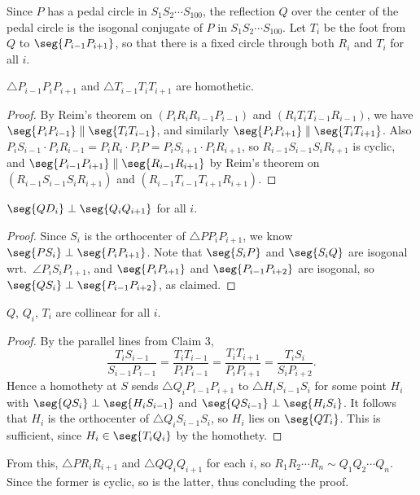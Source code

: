 Since $P$ has a pedal circle in $S_1S_2\cdots S_{100}$, the reflection $Q$ over the center of the pedal circle is the isogonal conjugate of $P$ in $S_1S_2\cdots S_{100}$. Let $T_i$ be the foot from $Q$ to $\seg{P_{i-1}P_{i+1}}$, so that there is a fixed circle through both $R_i$ and $T_i$ for all $i$.
\begin{iclaim}
    $\triangle P_{i-1}P_iP_{i+1}$ and $\triangle T_{i-1}T_iT_{i+1}$ are homothetic.
\end{iclaim}
\begin{proof}
    By Reim's theorem on $(P_iR_iR_{i-1}P_{i-1})$ and $(R_iT_iT_{i-1}R_{i-1})$, we have $\seg{P_iP_{i-1}}\parallel\seg{T_iT_{i-1}}$, and similarly $\seg{P_iP_{i+1}}\parallel\seg{T_iT_{i+1}}$. Also $P_iS_{i-1}\cdot P_iR_{i-1}=P_iR_i\cdot P_iP=P_iS_{i+1}\cdot P_iR_{i+1}$, so $R_{i-1}S_{i-1}S_iR_{i+1}$ is cyclic, and $\seg{P_{i-1}P_{i+1}}\parallel\seg{R_{i-1}R_{i+1}}$ by Reim's theorem on $(R_{i-1}S_{i-1}S_iR_{i+1})$ and $(R_{i-1}T_{i-1}T_{i+1}R_{i+1})$.
\end{proof}
\begin{iclaim}
    $\seg{QD_i}\perp\seg{Q_iQ_{i+1}}$ for all $i$.
\end{iclaim}
\begin{proof}
    Since $S_i$ is the orthocenter of $\triangle PP_iP_{i+1}$, we know $\seg{PS_i}\perp\seg{P_iP_{i+1}}$. Note that $\seg{S_iP}$ and $\seg{S_iQ}$ are isogonal wrt.\ $\angle P_iS_iP_{i+1}$, and $\seg{P_iP_{i+1}}$ and $\seg{P_{i-1}P_{i+2}}$ are isogonal, so $\seg{QS_i}\perp\seg{P_{i-1}P_{i+2}}$, as claimed.
\end{proof}
\begin{iclaim}
    $Q$, $Q_i$, $T_i$ are collinear for all $i$.
\end{iclaim}
\begin{proof}
    By the parallel lines from Claim 3, \[\frac{T_iS_{i-1}}{S_{i-1}P_{i-1}}=\frac{T_iT_{i-1}}{P_iP_{i-1}}=\frac{T_iT_{i+1}}{P_iP_{i+1}}=\frac{T_iS_i}{S_iP_{i+2}}.\]
    Hence a homothety at $S$ sends $\triangle Q_iP_{i-1}P_{i+1}$ to $\triangle H_iS_{i-1}S_i$ for some point $H_i$ with $\seg{QS_i}\perp\seg{H_iS_{i-1}}$ and $\seg{QS_{i-1}}\perp\seg{H_iS_i}$. It follows that $H_i$ is the orthocenter of $\triangle Q_iS_{i-1}S_i$, so $H_i$ lies on $\seg{QT_i}$. This is sufficient, since $H_i\in\seg{T_iQ_i}$ by the homothety.
\end{proof}

From this, $\triangle PR_iR_{i+1}$ and $\triangle QQ_iQ_{i+1}$ for each $i$, so $R_1R_2\cdots R_n\sim Q_1Q_2\cdots Q_n$. Since the former is cyclic, so is the latter, thus concluding the proof.

